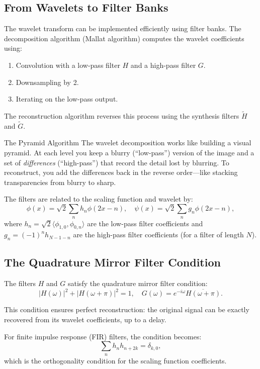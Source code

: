 \subsection{From Wavelets to Filter Banks}

The wavelet transform can be implemented efficiently using filter banks. The decomposition algorithm (Mallat algorithm) computes the wavelet coefficients using:
\begin{enumerate}
\item Convolution with a low-pass filter $H$ and a high-pass filter $G$.
\item Downsampling by 2.
\item Iterating on the low-pass output.
\end{enumerate}

The reconstruction algorithm reverses this process using the synthesis filters $\tilde H$ and $\tilde G$.

\begin{analogy}{The Pyramid Algorithm}
The wavelet decomposition works like building a visual pyramid.
At each level you keep a blurry (``low-pass'') version of the image
and a set of \emph{differences} (``high-pass'') that record the detail
lost by blurring. To reconstruct, you add the differences back in
the reverse order---like stacking transparencies from blurry to sharp.
\end{analogy}

The filters are related to the scaling function and wavelet by:
\[
\phi(x) = \sqrt{2} \sum_n h_n \phi(2x - n), \quad
\psi(x) = \sqrt{2} \sum_n g_n \phi(2x - n),
\]
where $h_n = \sqrt{2} \langle \phi_{1,0}, \phi_{0,n} \rangle$ are the low-pass filter coefficients and $g_n = (-1)^n h_{N-1-n}$ are the high-pass filter coefficients (for a filter of length $N$).

\subsection{The Quadrature Mirror Filter Condition}

The filters $H$ and $G$ satisfy the quadrature mirror filter condition:
\[
|H(\omega)|^2 + |H(\omega + \pi)|^2 = 1, \quad
G(\omega) = e^{-i\omega} \overline{H(\omega + \pi)}.
\]

This condition ensures perfect reconstruction: the original signal can be exactly recovered from its wavelet coefficients, up to a delay.

For finite impulse response (FIR) filters, the condition becomes:
\[
\sum_n h_n h_{n+2k} = \delta_{k,0},
\]
which is the orthogonality condition for the scaling function coefficients.

